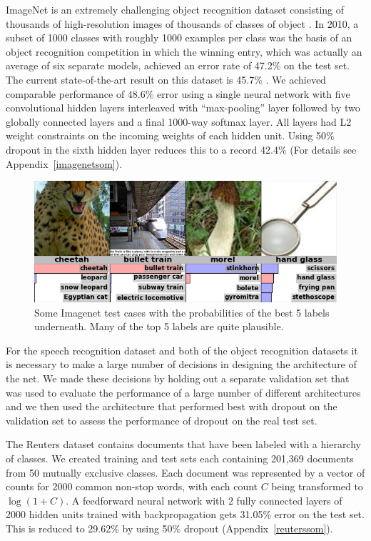 \documentclass[12pt]{article}
\begin{document}
ImageNet is an extremely challenging object recognition dataset consisting of thousands of
high-resolution images of thousands of classes of object \cite{Imagenet}. In 2010, a
subset of 1000 classes with roughly 1000 examples per class was the basis of an object
recognition competition in which the winning entry, which was actually an average of six
separate models, achieved an error rate of 47.2\% on the test set. The current state-of-the-art 
result on this dataset is 45.7\% \cite{winner45}. We achieved comparable performance of 
48.6\% error using a single neural
network with five convolutional hidden layers interleaved with ``max-pooling''
layer followed by two globally connected layers and a final
1000-way softmax layer. All layers had L2 weight constraints on the incoming weights of
each hidden unit. Using 50\% dropout in the sixth hidden layer reduces this to a record
42.4\% (For details see Appendix~\ref{imagenetsom}).

\begin{figure}[b]
\centerline{\includegraphics[scale=0.4]{imagenet-examples2.png}}
\caption{Some Imagenet test cases with the probabilities of the best 5 labels
  underneath. Many of the top 5 labels are quite plausible.}
\label{fig:imagenet}
\end{figure}


For the speech recognition dataset and both of the object recognition datasets it is
necessary to make a large number of decisions in designing the architecture of the net. We
made these decisions by holding out a separate validation set that was used to evaluate
the performance of a large number of different architectures and we then used the
architecture that performed best with dropout on the validation set to assess the
performance of dropout on the real test set. 

The Reuters dataset contains documents that have been labeled with a hierarchy of 
classes. We created training and test sets each containing 201,369 documents from 50 mutually
exclusive classes. Each document was represented by a vector of counts for 2000 common
non-stop words, with each count $C$ being transformed to $\log(1+C)$. A feedforward neural
network with 2 fully connected layers of 2000 hidden units trained with backpropagation
gets 31.05\% error on the test set. This is reduced to 29.62\% by using 50\% dropout (Appendix~\ref{reuterssom}).
\end{document}
